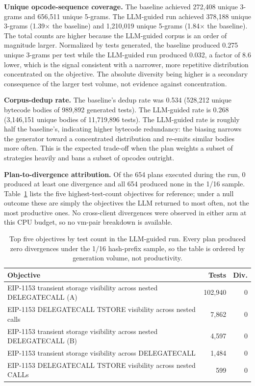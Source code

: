 \documentclass[conference]{IEEEtran}
\begin{document}
\textbf{Unique opcode-sequence coverage.} The baseline achieved 272{,}408 unique 3-grams and 656{,}511 unique 5-grams. The LLM-guided run achieved 378{,}188 unique 3-grams (1.39$\times$ the baseline) and 1{,}210{,}019 unique 5-grams (1.84$\times$ the baseline). The total counts are higher because the LLM-guided corpus is an order of magnitude larger. Normalized by tests generated, the baseline produced 0.275 unique 3-grams per test while the LLM-guided run produced 0.032, a factor of 8.6 lower, which is the signal consistent with a narrower, more repetitive distribution concentrated on the objective. The absolute diversity being higher is a secondary consequence of the larger test volume, not evidence against concentration.

\textbf{Corpus-dedup rate.} The baseline's dedup rate was 0.534 (528{,}212 unique bytecode bodies of 989{,}892 generated tests). The LLM-guided rate is 0.268 (3{,}146{,}151 unique bodies of 11{,}719{,}896 tests). The LLM-guided rate is roughly half the baseline's, indicating higher bytecode redundancy: the biasing narrows the generator toward a concentrated distribution and re-emits similar bodies more often. This is the expected trade-off when the plan weights a subset of strategies heavily and bans a subset of opcodes outright.

\textbf{Plan-to-divergence attribution.} Of the 654 plans executed during the run, 0 produced at least one divergence and all 654 produced none in the 1/16 sample. Table~\ref{tab:top_objectives} lists the five highest-test-count objectives for reference; under a null outcome these are simply the objectives the LLM returned to most often, not the most productive ones. No cross-client divergences were observed in either arm at this CPU budget, so no vm-pair breakdown is available.

\begin{table}[t]
\centering
\caption{Top five objectives by test count in the LLM-guided run. Every plan produced zero divergences under the 1/16 hash-prefix sample, so the table is ordered by generation volume, not productivity.}
\label{tab:top_objectives}
\small
\begin{tabular}{p{4.9cm}rr}
\hline
\textbf{Objective} & \textbf{Tests} & \textbf{Div.} \\
\hline
EIP-1153 transient storage visibility across nested DELEGATECALL (A) & 102{,}940 & 0 \\
EIP-1153 DELEGATECALL TSTORE visibility across nested calls & 7{,}862 & 0 \\
EIP-1153 transient storage visibility across nested DELEGATECALL (B) & 4{,}597 & 0 \\
EIP-1153 transient storage visibility across DELEGATECALL & 1{,}484 & 0 \\
EIP-1153 DELEGATECALL TSTORE visibility across nested CALLs & 599 & 0 \\
\hline
\end{tabular}
\end{table}
\end{document}
